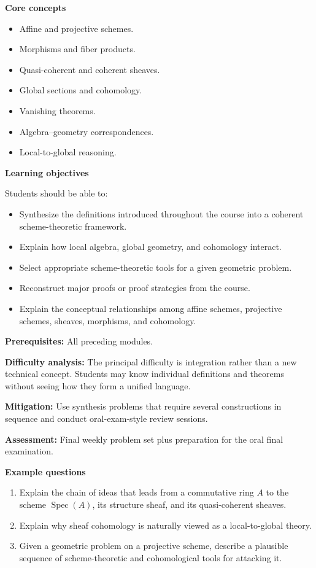 \documentclass[11pt]{article}
\begin{document}
\textbf{Core concepts}
\begin{itemize}
    \item Affine and projective schemes.
    \item Morphisms and fiber products.
    \item Quasi-coherent and coherent sheaves.
    \item Global sections and cohomology.
    \item Vanishing theorems.
    \item Algebra--geometry correspondences.
    \item Local-to-global reasoning.
\end{itemize}

\textbf{Learning objectives}

Students should be able to:
\begin{itemize}
    \item Synthesize the definitions introduced throughout the course into a coherent scheme-theoretic framework.
    \item Explain how local algebra, global geometry, and cohomology interact.
    \item Select appropriate scheme-theoretic tools for a given geometric problem.
    \item Reconstruct major proofs or proof strategies from the course.
    \item Explain the conceptual relationships among affine schemes, projective schemes, sheaves, morphisms, and cohomology.
\end{itemize}

\textbf{Prerequisites:} All preceding modules.

\textbf{Difficulty analysis:} The principal difficulty is integration rather than a new technical concept. Students may know individual definitions and theorems without seeing how they form a unified language.

\textbf{Mitigation:} Use synthesis problems that require several constructions in sequence and conduct oral-exam-style review sessions.

\textbf{Assessment:} Final weekly problem set plus preparation for the oral final examination.

\textbf{Example questions}
\begin{enumerate}
    \item Explain the chain of ideas that leads from a commutative ring $A$ to the scheme $\operatorname{Spec}(A)$, its structure sheaf, and its quasi-coherent sheaves.
    \item Explain why sheaf cohomology is naturally viewed as a local-to-global theory.
    \item Given a geometric problem on a projective scheme, describe a plausible sequence of scheme-theoretic and cohomological tools for attacking it.
\end{enumerate}
\end{document}
